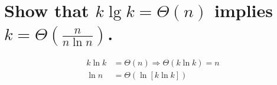 \section[Problem 3]{Show that $k \lg k = \Theta(n)$ implies $k = \Theta\left(\frac{n}{n \ln n}\right)$.}
\begin{align*}
	k \ln k &= \Theta(n) \Longrightarrow \Theta(k \ln k) = n \\
	\ln n &= \Theta ( \ln [k \ln k ] )
\end{align*}
